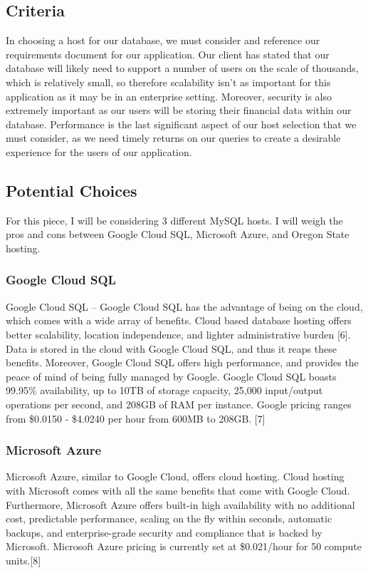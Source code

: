 \documentclass[onecolumn, draftclsnofoot,10pt, compsoc]{IEEEtran}
\begin{document}
\subsection{Criteria}
In choosing a host for our database, we must consider and reference our requirements document for our application. Our client has stated that our database will likely need to support a number of users on the scale of thousands, which is relatively small, so therefore scalability isn't as important for this application as it may be in an enterprise setting. Moreover, security is also extremely important as our users will be storing their financial data within our database. Performance is the last significant aspect of our host selection that we must consider, as we need timely returns on our queries to create a desirable experience for the users of our application.

\subsection{Potential Choices }
For this piece, I will be considering 3 different MySQL hosts. I will weigh the pros and cons between Google Cloud SQL, Microsoft Azure, and Oregon State hosting.

\subsubsection{Google Cloud SQL}
Google Cloud SQL – Google Cloud SQL has the advantage of being on the cloud, which comes with a wide array of benefits. Cloud based database hosting offers better scalability, location independence, and lighter administrative burden [6]. Data is stored in the cloud with Google Cloud SQL, and thus it reaps these benefits. Moreover, Google Cloud SQL offers high performance, and provides the peace of mind of being fully managed by Google. Google Cloud SQL boasts 99.95\% availability, up to 10TB of storage capacity, 25,000 input/output operations per second, and 208GB of RAM per instance. Google pricing ranges from \$0.0150 - \$4.0240 per hour from 600MB to 208GB. [7]

\subsubsection{Microsoft Azure}
Microsoft Azure, similar to Google Cloud, offers cloud hosting. Cloud hosting with Microsoft comes with all the same benefits that come with Google Cloud.  Furthermore, Microsoft Azure offers built-in high availability with no additional cost, predictable performance, scaling on the fly within seconds, automatic backups, and enterprise-grade security and compliance that is backed by Microsoft. Microsoft Azure pricing is currently set at \$0.021/hour for 50 compute units.[8]
\end{document}
